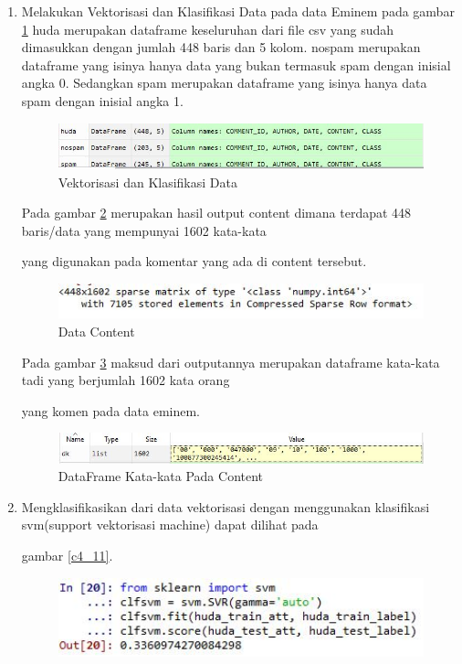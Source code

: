 \begin{enumerate}
\item Melakukan Vektorisasi dan Klasifikasi Data pada data Eminem pada gambar \ref{c4_8} huda merupakan dataframe keseluruhan dari file csv yang sudah dimasukkan dengan jumlah 448 baris dan 5 kolom. nospam merupakan dataframe yang isinya hanya data yang bukan termasuk spam dengan inisial angka 0. Sedangkan spam merupakan dataframe yang isinya hanya data spam dengan inisial angka 1.
\begin{figure}[!htbp]
	\centerline{\includegraphics[width=1\textwidth]{figures/huda/chapter4/8.JPG}}
	\caption{Vektorisasi dan Klasifikasi Data}
	\label{c4_8}
\end{figure}
\subitem  Pada gambar \ref{c4_9} merupakan hasil output content dimana terdapat 448 baris/data yang mempunyai 1602 kata-kata \par yang digunakan pada komentar yang ada di content tersebut.
\begin{figure}[!htbp]
	\centerline{\includegraphics[width=1\textwidth]{figures/huda/chapter4/9.JPG}}
	\caption{Data Content}
	\label{c4_9}
\end{figure}
\subitem Pada gambar \ref{c4_10} maksud dari outputannya merupakan dataframe kata-kata tadi yang berjumlah 1602 kata orang \par yang komen pada data eminem.
\begin{figure}[!htbp]
	\centerline{\includegraphics[width=1\textwidth]{figures/huda/chapter4/10.JPG}}
	\caption{DataFrame Kata-kata Pada Content}
	\label{c4_10}
\end{figure}
\item Mengklasifikasikan dari data vektorisasi dengan menggunakan klasifikasi svm(support vektorisasi machine) dapat dilihat pada \par gambar \ref{c4_11}.
\begin{figure}[!htbp]
	\centerline{\includegraphics[width=1\textwidth]{figures/huda/chapter4/11.JPG}}

\end{figure}
\end{enumerate}
